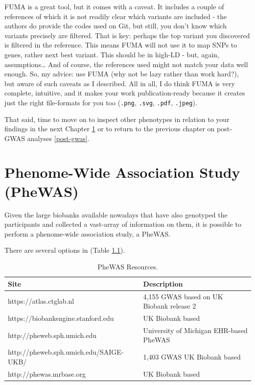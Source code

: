 \documentclass[
]{book}
\begin{document}
FUMA is a great tool, but it comes with a caveat. It includes a couple of references of which it is not readily clear which variants are included - the authors do provide the codes used on Git, but still, you don't know which variants precisely are filtered. That is key: perhaps the top variant you discovered is filtered in the reference. This means FUMA will not use it to map SNPs to genes, rather next best variant. This should be in high-LD - but, again, assumptions\ldots{} And of course, the references used might not match your data well enough.
So, my advice: use FUMA (why not be lazy rather than work hard?), but aware of such caveats as I described. All in all, I do think FUMA is very complete, intuitive, and it makes your work publication-ready because it creates just the right file-formats for you too (\texttt{.png}, \texttt{.svg}, \texttt{.pdf}, \texttt{.jpeg}).

That said, time to move on to inspect other phenotypes in relation to your findings in the next Chapter \ref{phewas} or to return to the previous chapter on post-GWAS analyses \ref{post-gwas}.

\hypertarget{phewas}{%
\chapter{Phenome-Wide Association Study (PheWAS)}\label{phewas}}

Given the large biobanks available nowadays that have also genotyped the participants and collected a vast-array of information on them, it is possible to perform a phenome-wide association study, a PheWAS.

There are several options in (Table \ref{tab:tab-phewas}).

\begin{table}

\caption{\label{tab:tab-phewas}PheWAS Resources.}
\centering
\begin{tabular}[t]{l|l}
\hline
Site & Description\\
\hline
https://atlas.ctglab.nl & 4,155 GWAS based on UK Biobank release 2\\
\hline
https://biobankengine.stanford.edu & UK Biobank based\\
\hline
http://pheweb.sph.umich.edu & University of Michigan EHR-based PheWAS\\
\hline
http://pheweb.sph.umich.edu/SAIGE-UKB/ & 1,403 GWAS UK Biobank based\\
\hline
http://phewas.mrbase.org & UK Biobank based\\
\hline
\end{tabular}
\end{table}
\end{document}

